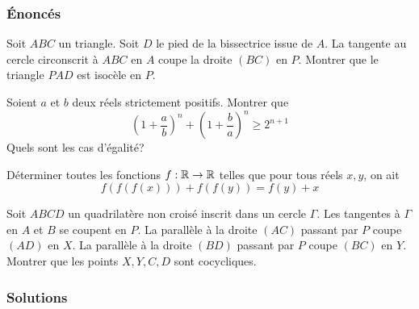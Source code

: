 \subsubsection{Énoncés}


\begin{exo}
Soit $ABC$ un triangle. Soit $D$ le pied de la bissectrice issue de $A$. La tangente au cercle circonscrit à $ABC$ en $A$ coupe la droite $(BC)$ en $P$. Montrer que le triangle $PAD$ est isocèle en $P$.
\end{exo}


\begin{exo}
Soient $a$ et $b$ deux réels strictement positifs. Montrer que
$$\left(1+\frac{a}{b}\right)^n+\left(1+\frac{b}{a}\right)^n\geq 2^{n+1} $$
Quels sont les cas d'égalité?
\end{exo}


\begin{exo}
Déterminer toutes les fonctions $f : \mathbb R\to \mathbb R$ telles que pour tous réels $x,y$, on ait
$$f(f(f(x))) + f(f(y)) = f(y) + x$$
\end{exo}


\begin{exo}
Soit $ABCD$ un quadrilatère non croisé inscrit dans un cercle $\Gamma$. Les tangentes à $\Gamma$ en $A$ et $B$ se coupent en $P$. La parallèle à la droite $(AC)$ passant par $P$ coupe $(AD)$ en $X$. La parallèle à la droite $(BD)$ passant par $P$ coupe $(BC)$ en $Y$. \\
Montrer que les points $X,Y,C,D$ sont cocycliques.
\end{exo}


\subsubsection{Solutions}


